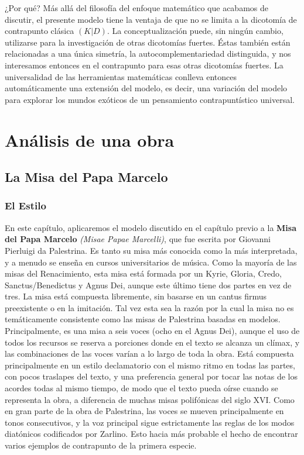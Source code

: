 \documentclass[letterpaper,12pt]{book}
\theoremstyle{definition} \newtheorem{Def}{Definición}[chapter]
\theoremstyle{definition} \newtheorem{Teo}{Teorema}[chapter]
\theoremstyle{definition} \newtheorem{Pro}{Proposición}[chapter]
\theoremstyle{definition} \newtheorem{Lema}{Lema}[chapter]
\begin{document}
¿Por qué? Más allá del filosofía del enfoque matemático que acabamos de discutir, el presente modelo tiene la ventaja de que no se limita a la dicotomía de contrapunto clásica $(K|D)$. La conceptualización puede, sin ningún cambio, utilizarse para la investigación de otras dicotomías fuertes. Éstas también están relacionadas a una única simetría, la autocomplementariedad distinguida, y nos interesamos entonces en el contrapunto para esas otras dicotomías fuertes. La universalidad de las herramientas matemáticas conlleva entonces automáticamente una extensión del modelo, es decir, una variación del modelo para explorar los mundos exóticos de un pensamiento contrapuntístico universal. 

\chapter{Análisis de una obra}

\section{La Misa del Papa Marcelo}

\subsection{El Estilo}

En este capítulo, aplicaremos el modelo discutido en el capítulo previo a la \textbf{Misa del Papa Marcelo} \emph{(Misae Papae Marcelli)}, que fue escrita por Giovanni Pierluigi da Palestrina. Es tanto su misa más conocida como la más interpretada, y a menudo se enseña en cursos universitarios de música. Como la mayoría de las misas del Renacimiento, esta misa está formada por un Kyrie, Gloria, Credo, Sanctus/Benedictus y Agnus Dei, aunque este último tiene dos partes en vez de tres. La misa está compuesta libremente, sin basarse en un cantus firmus preexistente o en la imitación. Tal vez esta sea la razón por la cual la misa no es temáticamente consistente como las misas de Palestrina basadas en modelos. Principalmente, es una misa a seis voces (ocho en el Agnus Dei), aunque el uso de todos los recursos se reserva a porciones donde en el texto se alcanza un clímax, y las combinaciones de las voces varían a lo largo de toda la obra. Está compuesta principalmente en un estilo declamatorio con el mismo ritmo en todas las partes, con pocos traslapes del texto, y una preferencia general por tocar las notas de los acordes todas al mismo tiempo, de modo que el texto pueda oírse cuando se representa la obra, a diferencia de muchas misas polifónicas del siglo XVI. Como en gran parte de  la obra de Palestrina, las voces se mueven principalmente en tonos consecutivos, y la voz principal sigue estrictamente las reglas de los modos diatónicos codificados por Zarlino. Esto hacia más probable el hecho de encontrar varios ejemplos de contrapunto de la primera especie.
\end{document}
